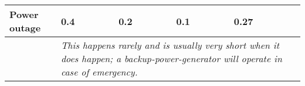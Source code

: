 \begin{longtable}{| p{4.2cm} | p{1.8cm} | p{1.8cm} | p{1.8cm} | p{1.8cm} |}
		Power outage & 0.4 & 0.2 & 0.1 & 0.27\\\hline
		& \multicolumn{4}{|p{8cm}|}{\textit{This happens rarely and is usually very short when it does happen; a backup-power-generator will operate in case of emergency.}}\\\hline
\end{longtable}




